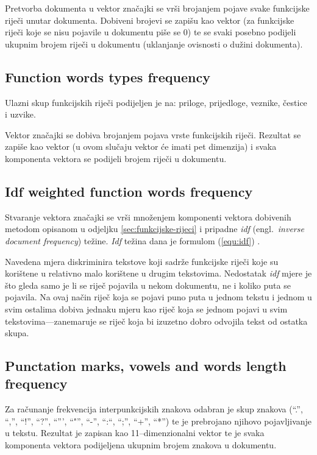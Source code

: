 \documentclass[11pt,english]{article}
\newcommand{\engl}[1]{(engl.~\emph{#1})}
\begin{document}
\begin{multicols}{2}
Pretvorba dokumenta u vektor značajki se vrši brojanjem pojave svake funkcijske
riječi unutar dokumenta. Dobiveni brojevi se zapišu kao vektor (za funkcijske
riječi koje se nisu pojavile u dokumentu piše se 0) te se svaki posebno podijeli
ukupnim brojem riječi u dokumentu (uklanjanje ovisnosti o dužini dokumenta).

\subsection{Function words types frequency}
\label{sec:funkcijske-rijeci-grupe}
Ulazni skup funkcijskih riječi podijeljen je na: priloge, prijedloge, veznike,
čestice i uzvike.

Vektor značajki se dobiva brojanjem pojava vrste funkcijskih riječi. Rezultat
se zapiše kao vektor (u ovom slučaju vektor će imati pet dimenzija) i svaka
komponenta vektora se podijeli brojem riječi u dokumentu.

\subsection{Idf weighted function words frequency}
\label{sec:funkcijske-rijeci-idf}
Stvaranje vektora značajki se vrši množenjem komponenti vektora dobivenih metodom
opisanom u odjeljku \ref{sec:funkcijske-rijeci} i pripadne \emph{idf} \engl{inverse
document frequency} težine. \emph{Idf} težina dana je formulom (\ref{equ:idf})
\citep{diederich2003authorship}.

Navedena mjera diskriminira tekstove koji sadrže funkcijske riječi koje su
korištene u relativno malo korištene u drugim tekstovima. Nedostatak \emph{idf}
mjere je što gleda samo je li se riječ pojavila u nekom dokumentu, ne i koliko
puta se pojavila. Na ovaj način riječ koja se pojavi puno puta u jednom
tekstu i jednom u svim ostalima dobiva jednaku mjeru kao riječ koja se jednom
pojavi u svim tekstovima---zanemaruje se riječ koja bi izuzetno dobro
odvojila tekst od ostatka skupa.

\subsection{Punctation marks, vowels and words length frequency}
\label{sec:znacajke-manje}
Za računanje frekvencija interpunkcijskih znakova odabran je skup znakova (``.'',
``,'', ``!'', ``?'', ``''', ``"'', ``-'', ``:``, ``;'', ``+'', ``*'') te je
prebrojano njihovo pojavljivanje u tekstu. Rezultat je zapisan kao
11--dimenzionalni vektor te je svaka komponenta vektora podijeljena ukupnim
brojem znakova u dokumentu.


\end{multicols}
\end{document}
